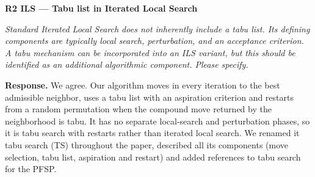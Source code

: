 \documentclass[12pt]{article}
\newenvironment{rc}[1]{\par\medskip\noindent\textbf{#1}\par\nopagebreak\noindent\itshape\renewcommand{\emph}[1]{\textbf{##1}}\ignorespaces}{\par}
\newcommand{\answer}[1]{\par\smallskip\noindent\textbf{Response.} #1\par}
\begin{document}
\begin{rc}{R2 ILS --- Tabu list in Iterated Local Search}
Standard Iterated Local Search does not inherently include a tabu list. Its defining components are typically local search, perturbation, and an acceptance criterion. A tabu mechanism can be incorporated into an ILS variant, but this should be identified as an additional algorithmic component. Please specify.
\end{rc}
\answer{We agree. Our algorithm moves in every iteration to the best admissible neighbor, uses a tabu list with an aspiration criterion and restarts from a random permutation when the compound move returned by the neighborhood is tabu. It has no separate local-search and perturbation phases, so it is tabu search with restarts rather than iterated local search. We renamed it tabu search (TS) throughout the paper, described all its components (move selection, tabu list, aspiration and restart) and added references to tabu search for the PFSP.}
\end{document}

